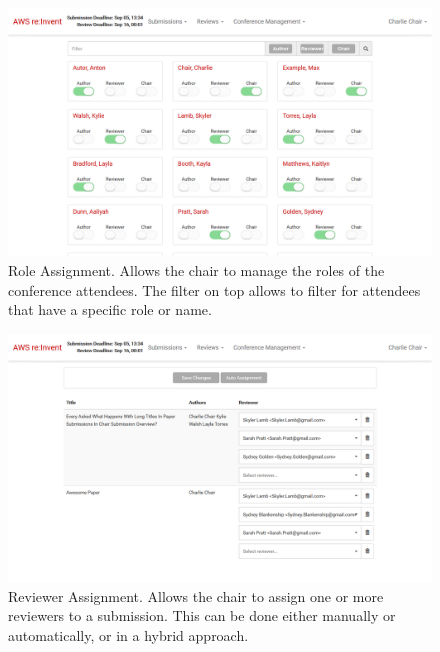 \documentclass[nochapterpage,nopartpage,noheadingspace,numbersubsubsec,bigchapter,colorback,accentcolor=tud9c,10pt]{tudreport}
\begin{document}
        \begin{figure}[!ht]
            \centering
            \includegraphics[width=\textwidth]{img/ui-user-role-assignment}
            \caption{Role Assignment. Allows the chair to manage the roles of the conference attendees. The filter on top allows to filter for attendees that have a specific role or name.}
            \label{fig:appendix:screenshots:ui-user-role-assignment}
        \end{figure}

        \begin{figure}[!ht]
            \centering
            \includegraphics[width=\textwidth]{img/ui-reviewer-assignment}
            \caption{Reviewer Assignment. Allows the chair to assign one or more reviewers to a submission. This can be done either manually or automatically, or in a hybrid approach.}
            \label{fig:appendix:screenshots:ui-reviewer-assignment}
        \end{figure}
\end{document}
